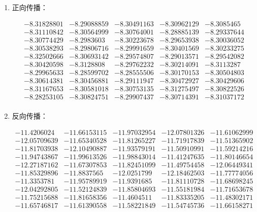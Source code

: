\begin{enumerate}
   \item 正向传播：
   
   \[
   \begin{array}{cccccccccc}
   -8.31828801 & -8.29088859 & -8.30491163 & -8.30962129 & -8.3085465 \\
   -8.31110842 & -8.30564999 & -8.30764001 & -8.28885139 & -8.29337644 \\
   -8.30774429 & -8.2983603 & -8.30223678 & -8.29653938 & -8.30036052 \\
   -8.30538293 & -8.29806716 & -8.29991659 & -8.30401569 & -8.30233275 \\
   -8.32502666 & -8.30693142 & -8.29574807 & -8.29013571 & -8.29542082 \\
   -8.30420598 & -8.3128808 & -8.29762232 & -8.30214091 & -8.3113287 \\
   -8.29965633 & -8.28599702 & -8.28555506 & -8.30170153 & -8.30504803 \\
   -8.30614381 & -8.30456881 & -8.29111947 & -8.30472927 & -8.30429606 \\
   -8.31167653 & -8.30581018 & -8.30753135 & -8.31275497 & -8.30822526 \\
   -8.28253105 & -8.30824751 & -8.29907437 & -8.30714391 & -8.31037172 \\
   \end{array}
   \]

   \item 反向传播：
   
   \[
   \begin{array}{cccccccccc}
   -11.4206024 & -11.66153115 & -11.97032954 & -12.07801326 & -11.61062999 \\
   -12.05709639 & -11.65340528 & -11.81265227 & -11.71917839 & -11.51365902 \\
   -11.81703938 & -12.10490887 & -11.93579191 & -11.50910991 & -11.59214216 \\
   -11.94743867 & -11.99613526 & -11.98843014 & -11.41247635 & -11.80146654 \\
   -12.27187162 & -11.67307853 & -11.82451099 & -11.49754458 & -12.06449341 \\
   -11.85329896 & -11.8837565 & -12.0251799 & -12.18462503 & -11.77774056 \\
   -11.3353781 & -11.95789919 & -11.9391685 & -11.81110728 & -11.68698245 \\
   -12.04292805 & -11.52124839 & -11.85804693 & -11.55181984 & -11.71653678 \\
   -11.75215688 & -11.81658356 & -11.4604511 & -11.83335205 & -11.48302171 \\
   -11.65746817 & -11.61390558 & -11.58221849 & -11.54745736 & -11.66158271 \\
   \end{array}
   \]
\end{enumerate}

